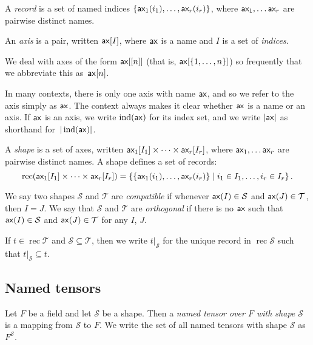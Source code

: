 \documentclass{article}
\DeclareMathOperator{\ind}{ind}
\DeclareMathOperator{\rec}{rec}
\newcommand{\restrict}[2]{\left.#1\right|_{#2}}
\begin{document}
A \emph{record} is a set of named indices $\{\mathsf{ax_\text{$1$}}(i_1), \ldots, \mathsf{ax_\text{$r$}}(i_r)\}$, where $\mathsf{ax_\text{$1$}}, \ldots \mathsf{ax_\text{$r$}}$ are pairwise distinct names. 

An \emph{axis} is a pair, written $\mathsf{ax}[I]$, where $\mathsf{ax}$ is a name and $I$ is a set of \emph{indices}.

We deal with axes of the form $\mathsf{ax}[[n]]$ (that is, $\mathsf{ax}[\{1, \ldots, n\}]$) so frequently that we abbreviate this as~$\mathsf{ax}[n]$.

In many contexts, there is only one axis with name $\mathsf{ax}$, and so we refer to the axis simply as $\mathsf{ax}$. The context always makes it clear whether $\mathsf{ax}$ is a name or an axis. If $\mathsf{ax}$ is an axis, we write $\ind(\name{ax})$ for its index set, and we write $|\mathsf{ax}|$ as shorthand for~$|\ind(\name{ax})|$.

A \emph{shape} is a set of axes, written $\mathsf{ax_\text{$1$}}[I_1] \times \cdots \times \mathsf{ax_\text{$r$}}[I_r]$, where $\mathsf{ax_\text{$1$}}, \ldots \mathsf{ax_\text{$r$}}$ are pairwise distinct names. A shape defines a set of records:
\begin{equation*}
\rec (\nset{ax\sub{1}}{I_1} \times \cdots \times \nset{ax\sub{r}}{I_r}) = \left\{\{\nidx{ax\sub{1}}{i_1}, \ldots, \nidx{ax\sub{r}}{i_r}\} \mid i_1 \in I_1, \ldots, i_r \in I_r\right\}.
\end{equation*}

We say two shapes $\mathcal{S}$ and $\mathcal{T}$ are \emph{compatible} if whenever $\mathsf{ax}(I) \in \mathcal{S}$ and $\mathsf{ax}(J) \in \mathcal{T}$, then $I = J$. We say that $\mathcal{S}$ and $\mathcal{T}$ are \emph{orthogonal} if there is no $\mathsf{ax}$ such that $\mathsf{ax}(I) \in \mathcal{S}$ and $\mathsf{ax}(J) \in \mathcal{T}$ for any $I$, $J$.

If $t \in \rec \mathcal{T}$ and $\mathcal{S} \subseteq \mathcal{T}$, then we write $\restrict{t}{\mathcal{S}}$ for the unique record in $\rec \mathcal{S}$ such that $\restrict{t}{\mathcal{S}} \subseteq t$.

\subsection{Named tensors}

Let $F$ be a field and let $\mathcal{S}$ be a shape. Then a \emph{named tensor over $F$ with shape $\mathcal{S}$} is a mapping from $\mathcal{S}$ to $F$. We write the set of all named tensors with shape $\mathcal{S}$ as $F^{\mathcal{S}}$.
\end{document}
